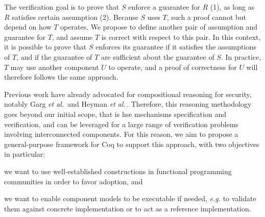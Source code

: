 \begin{center}
\end{center}

The verification goal is to prove that \( S \) enforce a guarantee for \( R \)
(1), as long as \( R \) satisfies certain assumption (2).
%
Because \( S \) uses \( T \), such a proof cannot but depend on how \( T \)
operates.
%
We propose to define another pair of assumption and guarantee for \( T \), and
assume \( T \) is correct with respect to this pair.
%
In this context, it is possible to prove that \( S \) enforces its guarantee if
it satisfies the assumptions of \( T \), and if the guarantee of \( T \) are
sufficient about the guarantee of \( S \).
%
In practice, \( T \) may use another component \( U \) to operate, and a proof
of correctness for \( U \) will therefore follows the same approach.

Previous work have already advocated for compositional reasoning for security,
notably Garg \emph{et al.}\,\cite{garg2010compositional} and Heyman \emph{et
  al.}\,\cite{heyman2012securemodel}.
%
Therefore, this reasoning methodology goes beyond our initial scope, that is
\ac{hse} mechanisms specification and verification, and can be leveraged for a
large range of verification problems involving interconnected components.
%
For this reason, we aim to propose a general-purpose framework for Coq to
support this approach, with two objectives in particular:
%
\begin{inparaenum}[(1)]
\item we want to use well-established constructions in functional programming
  communities in order to favor adoption, and
\item we want to enable component models to be executable if needed, \emph{e.g.}
  to validate them against concrete implementation or to act as a reference
  implementation.
\end{inparaenum}

